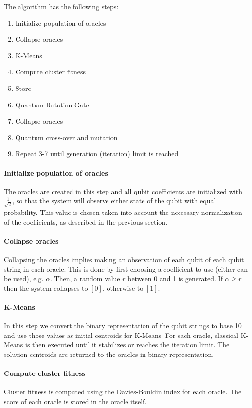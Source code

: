 The algorithm has the following steps:
\begin{enumerate}
\item Initialize population of oracles
\item Collapse oracles
\item K-Means
\item Compute cluster fitness
\item Store
\item Quantum Rotation Gate
\item Collapse oracles
\item Quantum cross-over and mutation
\item Repeat 3-7 until generation (iteration) limit is reached
\end{enumerate}


\paragraph{Initialize population of oracles}

The oracles are created in this step and all qubit coefficients are initialized with $\frac{1}{\sqrt{2}}$, so that the system will observe either state of the qubit with equal probability.
This value is chosen taken into account the necessary normalization of the coefficients, as described in the previous section.

\paragraph{Collapse oracles}

Collapsing the oracles implies making an observation of each qubit of each qubit string in each oracle.
This is done by first choosing a coefficient to use (either can be used), e.g. $\alpha$.
Then, a random value $r$ between 0 and 1 is generated.
If $\alpha \ge r$ then the system collapses to $[0]$, otherwise to $[1]$.

\paragraph{K-Means}
In this step we convert the binary representation of the qubit strings to base 10 and use those values as initial centroids for K-Means.
For each oracle, classical K-Means is then executed until it stabilizes or reaches the iteration limit.
The solution centroids are returned to the oracles in binary representation.

\paragraph{Compute cluster fitness}
Cluster fitness is computed using the Davies-Bouldin index for each oracle.
The score of each oracle is stored in the oracle itself.

